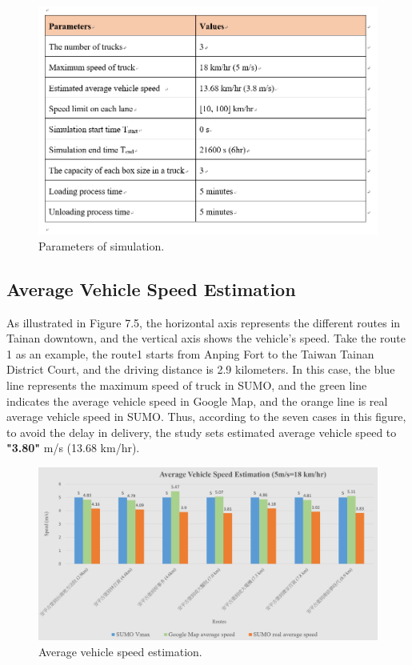 \documentclass[12pt]{ksthesis}
\begin{document}
\begin{thesis}
{\begin{figure}[H]
\centering
\includegraphics[width=1.0\textwidth]{./Thesis_figures/F7-4_parameters.PNG}
\caption{\large Parameters of simulation.}
\vspace{0.5cm}
\label{Fig:Parameters_of_Simulation}
\end{figure}

\subsection{Average Vehicle Speed Estimation}

As illustrated in Figure 7.5, the horizontal axis represents the different routes in Tainan downtown, and the vertical axis shows the vehicle's speed. Take the route 1 as an example, the route1 starts from Anping Fort to the Taiwan Tainan District Court, and the driving distance is 2.9 kilometers. In this case, the blue line represents the maximum speed of truck in SUMO, and the green line indicates the average vehicle speed in Google Map, and the orange line is real average vehicle speed in SUMO. Thus, according to the seven cases in this figure, to avoid the delay in delivery, the study sets estimated average vehicle speed to \textbf{"3.80"} m/s (13.68 km/hr).


\begin{figure}[H]
\centering
\includegraphics[width=1.14\textwidth]{./Thesis_figures/F7-5_speedEstimation.PNG}
\caption{\large Average vehicle speed estimation.}
\vspace{0.5cm}
\label{Fig:Average_vehicleSpeedEstimation}
\end{figure}

}
\end{thesis}
\end{document}

